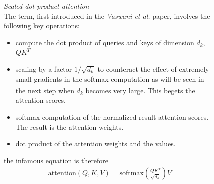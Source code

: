 \documentclass[12pt]{article}
\newcommand{\customtext}[3]{%
    \vspace{#2} %
    \fontsize{13}{8}\textcolor{#1}{\textit{#3}}%
}
\newcommand{\sidecite}[1]{\textsuperscript{\textcolor{blue}{\textbf{\scriptsize#1}}}}
\newcommand{\maincitecount}{\sidecite{\stepcounter{maincite}\themaincite}}
\begin{document}
\pagebreak
\begin{figure}[!htb]
    \begin{minipage}[t]{0.65\textwidth}
    \raggedright
    \customtext{xtitle}{-1em}{Scaled dot product attention}\\
    The term, first introduced in the {\it Vaswani et al.} paper, involves the following key operations:
    \begin{itemize}[left=0pt,topsep=0pt,itemsep=-1ex,parsep=0ex]
        \item compute the dot product of queries and keys of dimension $d_k$, $QK^T$
        \item scaling by a factor $1/\sqrt{d_k}$ to counteract the effect of extremely small gradients in the 
        softmax computation as will be seen in the next step when $d_k$ becomes very large{}{\maincitecount}.
        This begets the attention scores.
        \item softmax computation of the normalized result attention scores. The result is the attention weights.
        \item dot product of the attention weights and the values.
      \end{itemize}
      \vspace{1em}
      the infamous equation is therefore\\
      \vspace{-2em}
      \begin{gather*}
          \text{attention}(Q,K,V)=\text{softmax}\left(\frac{QK^T}{\sqrt{d_k}}\right)V
      \end{gather*}
      \begin{figure}[H]
        \centering
\end{figure}
\end{minipage}
\end{figure}
\end{document}
